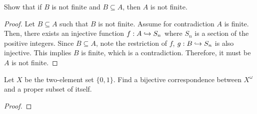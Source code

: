 \documentclass[12pt]{article}
\begin{document}
     Show that if $B$ is not finite and $B \subseteq A$,
    then $A$ is not finite.

    \begin{proof}
        Let $B \subseteq A$ such that $B$ is not finite. Assume for contradiction
        $A$ is finite. Then, there exists an injective function 
        $f: A \hookrightarrow S_n$ where $S_n$ is a section of the positive integers.
        Since $B \subseteq A$, note the restriction of $f$, $g: B \hookrightarrow S_n$
        is also injective. This implies $B$ is finite, which is a contradiction.
        Therefore, it must be $A$ is not finite. 
    \end{proof}

     Let $X$ be the two-element set $\{0, 1\}$. Find a bijective
    correspondence between $X^\omega$ and a proper subset of itself. 

    \begin{proof}
    \end{proof}
\end{document}
